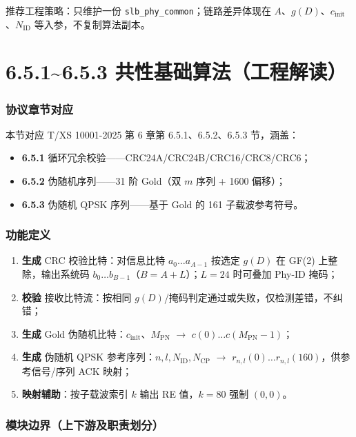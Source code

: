 \documentclass[11pt,a4paper]{ctexart}
\begin{document}
推荐工程策略：只维护一份 \texttt{slb\_phy\_common}；链路差异体现在 $A$、$g(D)$、$c_{\mathrm{init}}$、$N_{\mathrm{ID}}$ 等入参，不复制算法副本。

\newpage
\part{6.5.1\textasciitilde 6.5.3 共性基础算法（工程解读）}

\section{协议章节对应}

本节对应 T/XS 10001-2025 第 6 章第 6.5.1、6.5.2、6.5.3 节，涵盖：
\begin{itemize}[nosep]
  \item \textbf{6.5.1} 循环冗余校验——CRC24A/CRC24B/CRC16/CRC8/CRC6；
  \item \textbf{6.5.2} 伪随机序列——31 阶 Gold（双 $m$ 序列 + 1600 偏移）；
  \item \textbf{6.5.3} 伪随机 QPSK 序列——基于 Gold 的 161 子载波参考符号。
\end{itemize}

\section{功能定义}

\begin{enumerate}[nosep]
  \item \textbf{生成} CRC 校验比特：对信息比特 $a_0\ldots a_{A-1}$ 按选定 $g(D)$ 在 GF(2) 上整除，输出系统码 $b_0\ldots b_{B-1}$（$B{=}A{+}L$）；$L{=}24$ 时可叠加 Phy-ID 掩码；
  \item \textbf{校验} 接收比特流：按相同 $g(D)$/掩码判定通过或失败，仅检测差错，不纠错；
  \item \textbf{生成} Gold 伪随机比特：$c_{\mathrm{init}}$、$M_{\mathrm{PN}}$ $\rightarrow$ $c(0)\ldots c(M_{\mathrm{PN}}{-}1)$；
  \item \textbf{生成} 伪随机 QPSK 参考序列：$n,l,N_{\mathrm{ID}},N_{\mathrm{CP}}$ $\rightarrow$ $r_{n,l}(0)\ldots r_{n,l}(160)$，供参考信号/序列 ACK 映射；
  \item \textbf{映射辅助}：按子载波索引 $k$ 输出 RE 值，$k{=}80$ 强制 $(0,0)$。
\end{enumerate}

\section{模块边界（上下游及职责划分）}
\end{document}
